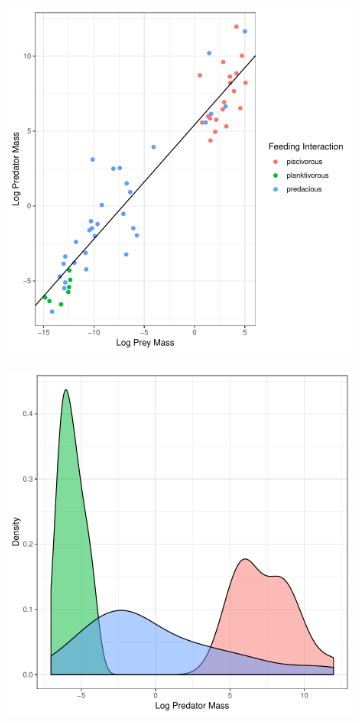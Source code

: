 \documentclass[11pt,a4paper]{article}
\begin{document}
	\begin{figure}[H]
		\centering %
		\begin{subfigure}[t]{0.45\linewidth}
			\includegraphics[width=\linewidth]{../Results/lin_mod_feeding.pdf}
			\caption{}
		\end{subfigure}
		\begin{subfigure}[t]{0.45\linewidth}
			\includegraphics[width=\linewidth]{../Results/density_feeding.pdf}

\end{subfigure}
\end{figure}
\end{document}
